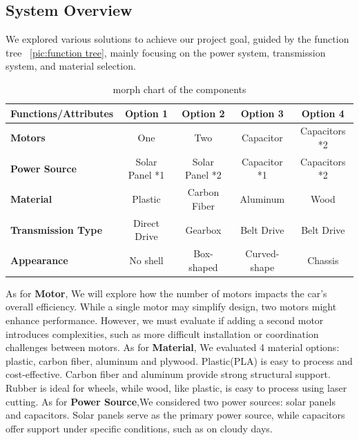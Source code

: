 \documentclass[12pt]{article}
\begin{document}
\subsection{System Overview}
We explored various solutions to achieve our project goal, guided by the function tree ~\ref{pic:function tree}, 
mainly focusing on the power system, transmission system, and material selection.
\begin{table}[h!]
\centering
\begin{tabular}{|>{\bfseries}l|c|c|c|c|}
\hline
\textbf{Functions/Attributes} & \textbf{Option 1} & \textbf{Option 2} & \textbf{Option 3} & \textbf{Option 4} \\
\hline
Motors & One & Two & Capacitor & Capacitors *2 \\
\hline
Power Source & Solar Panel *1 & Solar Panel *2 & Capacitor *1 & Capacitors *2 \\
\hline
Material & Plastic & Carbon Fiber & Aluminum & Wood \\
\hline
Transmission Type & Direct Drive & Gearbox & Belt Drive & Belt Drive \\
\hline
Appearance & No shell & Box-shaped & Curved-shape & Chassis\\
\hline
\end{tabular}
\caption{morph chart of the components}
\end{table}
\newline
As for \textbf{Motor}, We will explore how the number of motors impacts the car’s overall efficiency. 
While a single motor may simplify design, two motors might enhance performance. 
However, we must evaluate if adding a second motor introduces complexities, 
such as more difficult installation or coordination challenges between motors.
\newline
\newline
As for \textbf{Material}, We evaluated 4 material options: plastic, carbon fiber, aluminum and plywood. 
Plastic(PLA) is easy to process and cost-effective. 
Carbon fiber and aluminum provide strong structural support. 
Rubber is ideal for wheels, while wood, like plastic, is easy to process using laser cutting.
\newline
\newline
As for \textbf{Power Source},We considered two power sources: solar panels and capacitors. 
Solar panels serve as the primary power source, while capacitors offer support under specific conditions, 
such as on cloudy days.
\newline
\newline
\end{document}
